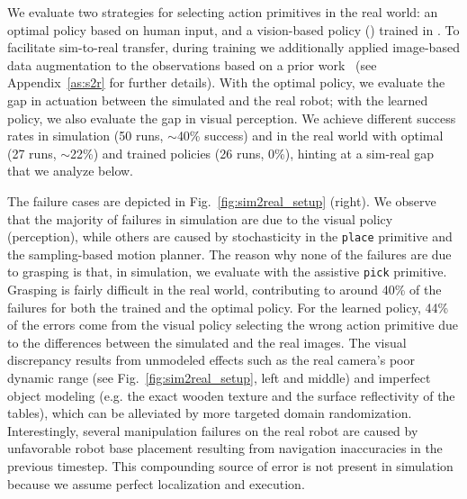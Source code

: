 We evaluate two strategies for selecting action primitives in the real world: an optimal policy based on human input, and a vision-based policy (\rlprim) trained in \simulator. To facilitate sim-to-real transfer, during training we additionally applied image-based data augmentation to the observations based on a prior work~\cite{fan2021secant} (see Appendix~\ref{as:s2r} for further details). With the optimal policy, we evaluate the gap in actuation between the simulated and the real robot; with the learned policy, we also evaluate the gap in visual perception. We achieve different success rates in simulation (50 runs, $\sim$40\% success) and in the real world with optimal (27 runs, $\sim$22\%) and trained policies (26 runs, 0\%), hinting at a sim-real gap that we analyze below.

The failure cases are depicted in Fig.~\ref{fig:sim2real_setup} (right). We observe that the majority of failures in simulation are due to the visual policy (perception), while others are caused by stochasticity in the \texttt{place} primitive and the sampling-based motion planner. The reason why none of the failures are due to grasping is that, in simulation, we evaluate with the assistive \texttt{pick} primitive. %
Grasping is fairly difficult in the real world, contributing to around 40\% of the failures for both the trained and the optimal policy. %
For the learned policy, 44\% of the errors come from the visual policy selecting the wrong action primitive due to the differences between the simulated and the real images. The visual discrepancy results from unmodeled effects such as the real camera's poor dynamic range (see Fig.~\ref{fig:sim2real_setup}, left and middle) %
and imperfect object modeling (e.g. the exact wooden texture and the surface reflectivity of the tables), which can be alleviated by more targeted domain randomization.
Interestingly, several manipulation failures on the real robot are caused by unfavorable robot base placement resulting from navigation inaccuracies in the previous timestep. This compounding source of error is not present in simulation because we assume perfect localization and execution. %

